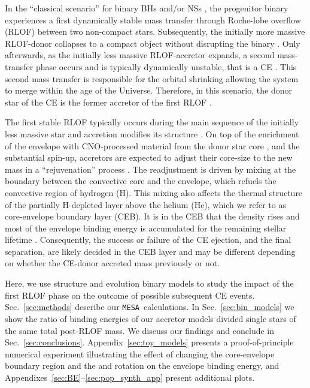 \documentclass[twocolumn,twocolappendix,trackchanges]{aastex63}
\newcommand{\code}[1]{\texttt{#1}}
\newcommand{\mesa}{\code{MESA}}
\DeclareRobustCommand{\Secref}[1]{Sec.~\ref{#1}}
\begin{document}
In the ``classical scenario'' for binary BHs and/or NSs
\citep[e.g.,][]{tutukov:93,belczynski:2016, tauris:2017}, the
progenitor binary %
experiences a first dynamically stable mass transfer through
Roche-lobe overflow (RLOF) between two non-compact
stars. Subsequently, the
initially more massive RLOF-donor collapses to a compact object
without disrupting the binary
\citep[e.g.,][]{blaauw:1961,renzo:2019walk}. Only afterwards, as the
initially less massive RLOF-accretor expands, a second mass-transfer
phase occurs and is typically dynamically unstable, that is a CE
\citep[e.g.,][]{dominik:2012, belczynski:2016, kruckow:18}. This
second mass transfer is responsible for the orbital shrinking
\citep{paczynski:1976} allowing the system to merge within the age of
the Universe. Therefore, in this scenario, the donor star of the CE is
the former accretor of the first RLOF \citep[e.g.,][]{klencki:2020,
  law-smith:2020, renzo:2021zoph}.

The first stable RLOF typically occurs during the main sequence of the
initially less massive star and accretion modifies its structure
\citep[e.g.,][]{neo:1977, packet:1981, blaauw:1993, cantiello:2007,
  renzo:2021zoph}. On top of the enrichment of the envelope with
CNO-processed material from the donor star core \citep{blaauw:1993,
  renzo:2021zoph, el-badry:2022a}, and the substantial spin-up,
accretors are expected to adjust their core-size to the new mass in a
``rejuvenation'' process \citep[e.g.,][]{neo:1977, hellings:1983,
  hellings:1984}. The readjustment is driven by mixing at the boundary
between the convective core and the envelope, which refuels the
convective region of hydrogen (H). This mixing also affects the
thermal structure of the partially H-depleted layer above the helium
(He), which we refer to as core-envelope boundary layer (CEB). It is
in the CEB that the density rises and most of the envelope binding
energy is accumulated for the remaining stellar lifetime
\citep[e.g.,][]{tauris:01, ivanova:2013, ivanova:2020}. Consequently, the success
or failure of the CE ejection, and the final separation, are likely
decided in the CEB layer and may be different depending on whether the
CE-donor accreted mass previously or not.

Here, we use structure and evolution binary models to study the impact
of the first RLOF phase on the outcome of possible subsequent CE
events. \Secref{sec:methods} describe our \mesa\ calculations. In
\Secref{sec:bin_models} we show the ratio of binding energies of our
accretor models divided single stars of the same total post-RLOF mass. We
discuss our findings and conclude in \Secref{sec:conclusions}.
Appendix~\ref{sec:toy_models} presents a proof-of-principle numerical
experiment illustrating the effect of changing the core-envelope
boundary region and the and rotation on the envelope binding energy,
and Appendixes~\ref{sec:BE}--\ref{sec:pop_synth_app} present
additional plots.
\end{document}
